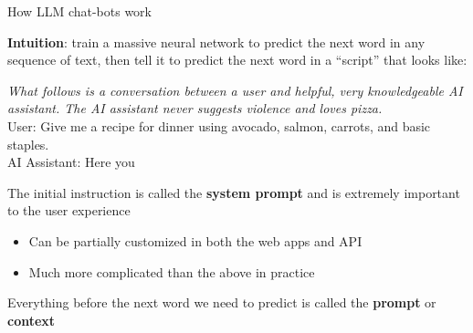\documentclass[xcolor=table, aspectratio=169]{beamer}
\newcommand{\alertbf}[1]{\alert{\textbf{#1}}}
\begin{document}
\begin{frame}{How LLM chat-bots work}

\alertbf{Intuition}: train a massive neural network to predict the next word in any sequence of text, then tell it to predict the next word in a ``script'' that looks like:

\begin{framed}
  \textit{What follows is a conversation between a user and helpful, very knowledgeable AI assistant. The AI assistant never suggests violence and loves pizza.} \\
\vspace{12pt}
    User: Give me a recipe for dinner using avocado, salmon, carrots, and basic staples. \\
\vspace{12pt}
    AI Assistant: Here you \underline{\hspace{24pt}}
\end{framed}

The initial instruction is called the \alertbf{system prompt} and is extremely important to the user experience
\begin{itemize}
    \item Can be partially customized in both the web apps and API
    \item Much more complicated than the above in practice
\end{itemize}

Everything before the next word we need to predict is called the \alertbf{prompt} or \alertbf{context}

\end{frame}
\end{document}
